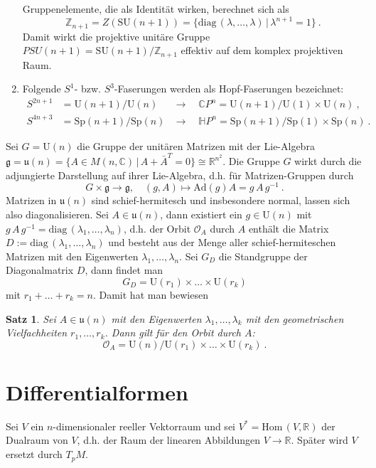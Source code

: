\documentclass[12pt,a4paper]{article}
\def\R{\mathbb{R}}
\def\C{\mathbb{C}}
\def\H{\mathbb{H}}
\def\Z{\mathbb{Z}}
\def\u{\mathfrak{u}}
\def\SU{\mathrm{SU}}
\def\Sp{\mathrm{Sp}}
\def\U{\mathrm{U}}
\def\Ad{\mathrm{Ad}}
\def\Hom{\mathrm{Hom}\,}
\def\g{\mathfrak{g}}
\def\diag{\mathrm{diag}\,}
\newtheorem{Satz}[Lemma]{Satz}
\begin{document}
\begin{enumerate}
Gruppenelemente, die als Identit\"at wirken, berechnet sich als
$$
\Z_{n+1} = Z(\SU(n+1)) = \{\diag(\lambda, \ldots, \lambda) \,|\, \lambda^{n+1} = 1\} \ .
$$
Damit wirkt die projektive unit\"are Gruppe $PSU(n+1) = \SU(n+1)/\Z_{n+1}$ effektiv auf
dem komplex projektiven Raum.
\item
Folgende $S^1$- bzw. $S^3$-Faserungen werden als Hopf-Faserungen bezeichnet:
$$
\begin{array}{lll}
S^{2n+1} & =  \U(n+1)/\U(n)  & \longrightarrow \quad \C P^n = \U(n+1)/\U(1) \times  \U(n) \ , \\[1.5ex]
S^{4n+3} & =  \Sp(n+1)/\Sp(n) & \longrightarrow \quad \H P^n = \Sp(n+1)/\Sp(1) \times  \Sp(n) \ .
\end{array}
$$
\end{enumerate}

\bigskip

Sei $G= \U(n)$ die Gruppe der unit\"aren Matrizen mit der Lie-Algebra
$\g = \u(n) = \{ A \in M(n, \C)\, |\, A + \bar A^T =0\} \cong \R^{n^2}$. Die Gruppe
$G$ wirkt durch die adjungierte Darstellung auf ihrer Lie-Algebra, d.h. f\"ur
Matrizen-Gruppen durch
$$
G \times \g \rightarrow \g,\quad (g, A) \mapsto \Ad(g)A = g\,A\,g^{-1} \ .
$$
Matrizen in $\u(n)$ sind schief-hermitesch und insbesondere normal, lassen sich also
diagonalisieren. Sei $A \in \u(n)$, dann existiert ein $g\in \U(n)$ mit
$g\,A\,g^{-1}= \diag(\lambda_1,\ldots,\lambda_n)$, d.h. der Orbit $\mathcal O_A$
durch $A$ enth\"alt die Matrix $D:=\diag(\lambda_1,\ldots,\lambda_n)$ und besteht aus der Menge
aller schief-hermiteschen Matrizen mit den Eigenwerten $\lambda_1,\ldots,\lambda_n$.
Sei $G_D$ die Standgruppe der Diagonalmatrix $D$, dann findet man
$$
G_D = \U(r_1) \times \ldots \times \U(r_k)
$$
mit $r_1 + \ldots + r_k = n$. Damit hat man bewiesen

\begin{Satz}
Sei $A \in \u(n)$ mit den Eigenwerten $\lambda_1,\ldots, \lambda_k$ mit den geometrischen
Vielfachheiten $r_1,\ldots, r_k$. Dann gilt f\"ur den Orbit durch $A$:
$$
\mathcal O_A = \U(n)/\U(r_1) \times \ldots \times \U(r_k) \ .
$$
\end{Satz}

\bigskip

\section{Differentialformen}

Sei $V$ ein $n$-dimensionaler reeller Vektorraum und sei $V^* = \Hom(V, \R)$
der Dualraum von $V$, d.h. der Raum der linearen Abbildungen $V\rightarrow \R$.
Sp\"ater wird $V$ ersetzt durch $T_pM$.
\end{document}
